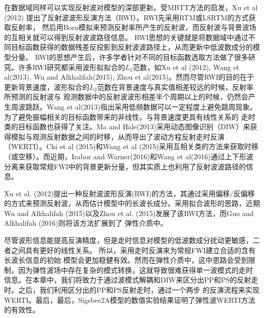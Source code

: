 在数据域同样可以实现反射波对模型的深部更新。受MBTT方法的启发，Xu et al (2012)\cite{xu:2012}
提出了反射波波形反演方法（RWI）。RWI先采用RTM或LSRTM的方式获取反射率，
然后用Born模拟来预测反射率所产生的反射波，而反射波与背景波场的互相关就可以得到反射波波路径信息。
RWI思想的关键就是将数据域中通过不同目标函数获得的数据残差反投影到反射波波路径上，从而更新中低波数成分的模型分量。
RWI的思想产生后，许多学者针对不同的目标函数选取方法做了很多研究。许多RWI研究都采用波形拟拟合的$L_2$范数，如Xu
et al (2012)\cite{xu:2012}, Wang et al(2013)\cite{Wang2013}, Wu and
Alkhalifah(2015)\cite{Wu2015b},
Zhou et al(2015)\cite{zhou:2015}。然而尽管RWI的目的在于更新背景速度，波形拟合的$L_2$范数在背景速度与真实值相差较远的时候，反射率所预测的反射波与
观测数据中的反射波波形相差半个周期以上的时候，仍然会产生周波跳跃。Wang et
al(2013)\cite{Wang2013}指出采用低频数据可以一定程度上避免跳周现象。为了避免振幅相关的目标函数带来的非线性，与背景速度更具有线性关系的
走时类的目标函数也获得了关注。Ma and
Hale(2013)\cite{ma2013}采用动态图像识别（DIW）来获得模拟与观测反射数据之间的时移，从而导出了波动方程反射走时反演（WERTI）。Chi
et al (2015)\cite{chi2015}和Wang et al
(2015)\cite{Wang2015}采用互相关类的方法来获取时移（或空移）。而近期，Irabor and
Warner(2016)\cite{Irabor2016}和Wang et al(2016)\cite{WangEtAl2016}通过上下形波分离来获取常规FWI中的背景更新分量，但其实质上也利用了反射波波路径的信息。

Xu et al. (2012)\cite{xu:2012}提出一种反射波波形反演(RWI)的方法，其通过采用偏移/反偏移的方式来预测反射波，从而估计模型中的长波长成分。采用拟合波形的思路，近期
Wu and Alkhalifah (2015)\cite[]{Wu2015b}以及Zhou et al. (2015)\cite[]{Zhou2015}发展了该RWI方法，而Guo and Alkhalifah (2016)\cite{Guo2016}则将该方法扩展到了
弹性介质中。

尽管波形信息能提高反演精度，但是走时信息对模型的低波数成分扰动更敏感，二者之间具有更好的线性关系。
所以，采用走时反演来为常规FWI建立合适的含有长波长信息的初始
模型会更加稳健有效\cite[]{Ma2013, Chi2015, Luo2016}。然而在弹性介质中，这中思路会受到限制，因为弹性波场中存在复杂的模式转换，这就导致很难获得单一波模式的走时
信息。在本章中，我们将致力于通过波模式解耦和DIW\cite[]{Ma2013}来区分出PP和PS的反射走时。之后，我们利用区分出的PP和PS反射走时，通过一个两步
的反演流程来实现WERTI\cite[]{Hale2013}。最后，最后，Sigsbee2A模型的数值实验结果证明了弹性波WERTI方法的有效性。
